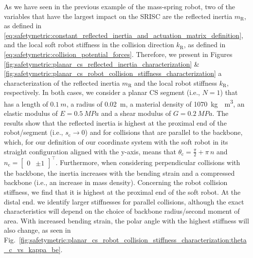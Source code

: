 As we have seen in the previous example of the mass-spring robot, two of the variables that have the largest impact on the \gls{SRISC} are the reflected inertia $m_\mathrm{R}$, as defined in
\eqref{eq:safetymetric:constant_reflected_inertia_and_actuation_matrix_definition}, and the local soft robot stiffness in the collision direction $k_\mathrm{R}$, as defined in \eqref{eq:safetymetric:collision_potential_forces}.
Therefore, we present in Figures \ref{fig:safetymetric:planar_cs_reflected_inertia_characterization} \& \ref{fig:safetymetric:planar_cs_robot_collision_stiffness_characterization} a characterization of the reflected inertia $m_\mathrm{R}$ and the local robot stiffness $k_\mathrm{R}$, respectively.
In both cases, we consider a planar \gls{CS} segment (i.e., $N=1$) that has a length of $\SI{0.1}{m}$, a radius of \SI{0.02}{m}, a material density of \SI{1070}{kg \per m^3}, an elastic modulus of $E=\SI{0.5}{MPa}$ and a shear modulus of $G=\SI{0.2}{MPa}$.
The results show that the reflected inertia is highest at the proximal end of the robot/segment (i.e., $s_\mathrm{c} \to 0$) and for collisions that are parallel to the backbone, which, for our definition of our coordinate system with the soft robot in its straight configuration aligned with the y-axis, means that $\theta_\mathrm{c} = \frac{\pi}{2} + \pi \, n$ and $n_\mathrm{c} = \begin{bmatrix}
    0 & \pm 1
\end{bmatrix}^\top$. Furthermore, when considering perpendicular collisions with the backbone, the inertia increases with the bending strain and a compressed backbone (i.e., an increase in mass density).
Concerning the robot collision stiffness, we find that it is highest at the proximal end of the soft robot. At the distal end. we identify larger stiffnesses for parallel collisions, although the exact characteristics will depend on the choice of backbone radius/second moment of area. With increased bending strain, the polar angle with the highest stiffness will also change, as seen in Fig.~\ref{fig:safetymetric:planar_cs_robot_collision_stiffness_characterization:theta_c_vs_kappa_be}.

